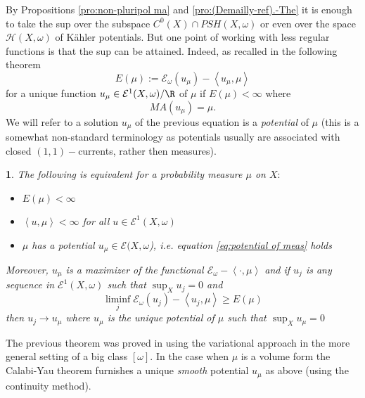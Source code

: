 \documentclass[11pt,oneside,english]{amsart}
\numberwithin{equation}{section}
\numberwithin{figure}{section}
\theoremstyle{plain}
\newtheorem{thm}{\protect\theoremname}[section]
\theoremstyle{plain}
\theoremstyle{plain}
\theoremstyle{plain}
\theoremstyle{remark}
\theoremstyle{definition}
\providecommand{\theoremname}{Theorem}
\begin{document}
By Propositions \ref{pro:non-pluripol ma} and \ref{pro:(Demailly-ref).-The}
it is enough to take the sup over the subspace $C^{0}(X)\cap PSH(X,\omega)$
or even over the space $\mathcal{H}(X,\omega)$ of Kähler potentials.
But one point of working with less regular functions is that the sup
can be attained. Indeed, as recalled in the following theorem 
\begin{equation}
E(\mu):=\mathcal{E}_{\omega}(u_{\mu})-\left\langle u_{\mu},\mu\right\rangle \label{eq:energy in terms of pot}
\end{equation}
 for a unique function $u_{\mu}\in\mathcal{E}^{1}(X,\omega)/\R$ of
$\mu$ if $E(\mu)<\infty$ where 
\begin{equation}
MA(u_{\mu})=\mu.\label{eq:potential of meas}
\end{equation}
We will refer to a solution $u_{\mu}$ of the previous equation is
a \emph{potential} of $\mu$ (this is a somewhat non-standard terminology
as potentials usually are associated with closed $(1,1)-$currents,
rather then measures). 
\begin{thm}
\label{thm:var sol of ma}\cite{bbgz}The following is equivalent
for a probability measure $\mu$ on $X:$ 
\begin{itemize}
\item $E(\mu)<\infty$ 
\item \textup{$\left\langle u,\mu\right\rangle <\infty$ for all $u\in\mathcal{E}^{1}(X,\omega)$} 
\item $\mu$ has a potential $u_{\mu}\in\mathcal{E}(X,\omega$), i.e. equation
\ref{eq:potential of meas} holds 
\end{itemize}
Moreover, $u_{\mu}$ is a maximizer of the functional $\mathcal{E}_{\omega}-\left\langle \cdot,\mu\right\rangle $
and if $u_{j}$ is any sequence in $\mathcal{E}^{1}(X,\omega)$ such
that $\sup_{X}u_{j}=0$ and 
\[
\liminf_{j}\mathcal{E}_{\omega}(u_{j})-\left\langle u_{j},\mu\right\rangle \geq E(\mu)
\]
 then $u_{j}\rightarrow u_{\mu}$ where $u_{\mu}$ is the unique potential
of $\mu$ such that $\sup_{X}u_{\mu}=0$
\end{thm}
The previous theorem was proved in \cite{bbgz} using the variational
approach in the more general setting of a big class $[\omega].$ In
the case when $\mu$ is a volume form the Calabi-Yau theorem \cite{y}
furnishes a unique \emph{smooth} potential $u_{\mu}$ as above (using
the continuity method).
\end{document}
